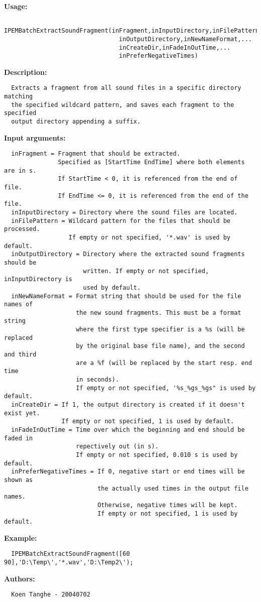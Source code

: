\textbf{Usage:}
\begin{verbatim}  IPEMBatchExtractSoundFragment(inFragment,inInputDirectory,inFilePattern,...
                                inOutputDirectory,inNewNameFormat,...
                                inCreateDir,inFadeInOutTime,...
                                inPreferNegativeTimes)

\end{verbatim}
\textbf{Description:}
\begin{verbatim}  Extracts a fragment from all sound files in a specific directory matching 
  the specified wildcard pattern, and saves each fragment to the specified 
  output directory appending a suffix.

\end{verbatim}
\textbf{Input arguments:}
\begin{verbatim}  inFragment = Fragment that should be extracted.
               Specified as [StartTime EndTime] where both elements are in s.
               If StartTime < 0, it is referenced from the end of file.
               If EndTime <= 0, it is referenced from the end of the file.
  inInputDirectory = Directory where the sound files are located.
  inFilePattern = Wildcard pattern for the files that should be processed.
                  If empty or not specified, '*.wav' is used by default.
  inOutputDirectory = Directory where the extracted sound fragments should be 
                      written. If empty or not specified, inInputDirectory is 
                      used by default.
  inNewNameFormat = Format string that should be used for the file names of
                    the new sound fragments. This must be a format string 
                    where the first type specifier is a %s (will be replaced 
                    by the original base file name), and the second and third 
                    are a %f (will be replaced by the start resp. end time
                    in seconds). 
                    If empty or not specified, '%s_%gs_%gs" is used by default.
  inCreateDir = If 1, the output directory is created if it doesn't exist yet.
                If empty or not specified, 1 is used by default.
  inFadeInOutTime = Time over which the beginning and end should be faded in
                    repectively out (in s).
                    If empty or not specified, 0.010 s is used by default.
  inPreferNegativeTimes = If 0, negative start or end times will be shown as 
                          the actually used times in the output file names.
                          Otherwise, negative times will be kept.
                          If empty or not specified, 1 is used by default.

\end{verbatim}
\textbf{Example:}
\begin{verbatim}  IPEMBatchExtractSoundFragment([60 90],'D:\Temp\','*.wav','D:\Temp2\');

\end{verbatim}
\textbf{Authors:}
\begin{verbatim}  Koen Tanghe - 20040702
\end{verbatim}


